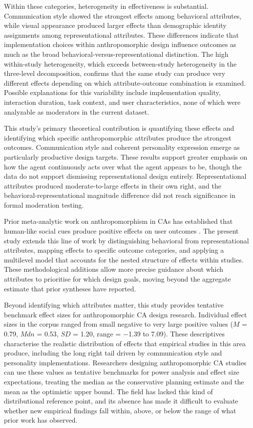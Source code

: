 \documentclass[lettersize,journal]{IEEEtran}
\begin{document}
Within these categories, heterogeneity in effectiveness is substantial. Communication style showed the strongest effects among behavioral attributes, while visual appearance produced larger effects than demographic identity assignments among representational attributes. These differences indicate that implementation choices within anthropomorphic design influence outcomes as much as the broad behavioral-versus-representational distinction. The high within-study heterogeneity, which exceeds between-study heterogeneity in the three-level decomposition, confirms that the same study can produce very different effects depending on which attribute-outcome combination is examined. Possible explanations for this variability include implementation quality, interaction duration, task context, and user characteristics, none of which were analyzable as moderators in the current dataset.

This study's primary theoretical contribution is quantifying these effects and identifying which specific anthropomorphic attributes produce the strongest outcomes. Communication style and coherent personality expression emerge as particularly productive design targets. These results support greater emphasis on how the agent continuously acts over what the agent appears to be, though the data do not support dismissing representational design entirely. Representational attributes produced moderate-to-large effects in their own right, and the behavioral-representational magnitude difference did not reach significance in formal moderation testing.

Prior meta-analytic work on anthropomorphism in CAs has established that human-like social cues produce positive effects on user outcomes \cite{klein_effects_2025,chaves2021should}. The present study extends this line of work by distinguishing behavioral from representational attributes, mapping effects to specific outcome categories, and applying a multilevel model that accounts for the nested structure of effects within studies. These methodological additions allow more precise guidance about which attributes to prioritise for which design goals, moving beyond the aggregate estimate that prior syntheses have reported.

Beyond identifying which attributes matter, this study provides tentative benchmark effect sizes for anthropomorphic CA design research. Individual effect sizes in the corpus ranged from small negative to very large positive values ($M$ = 0.79, $Mdn$ = 0.53, $SD$ = 1.20, range = $-$1.39 to 7.09). These descriptives characterise the realistic distribution of effects that empirical studies in this area produce, including the long right tail driven by communication style and personality implementations. Researchers designing anthropomorphic CA studies can use these values as tentative benchmarks for power analysis and effect size expectations, treating the median as the conservative planning estimate and the mean as the optimistic upper bound. The field has lacked this kind of distributional reference point, and its absence has made it difficult to evaluate whether new empirical findings fall within, above, or below the range of what prior work has observed.
\end{document}
